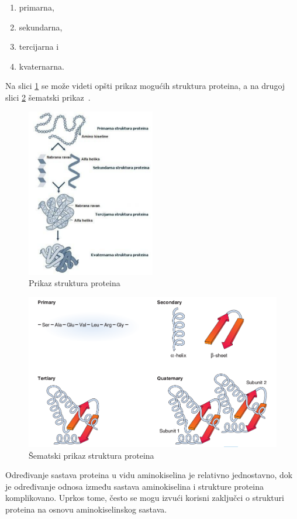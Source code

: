 \begin{enumerate}
\item primarna,
\item sekundarna,
\item tercijarna i
\item kvaternarna.
\end{enumerate}
Na slici \ref{fig:structures} se može videti opšti prikaz mogućih struktura proteina, a na drugoj slici \ref{fig:structures2} šematski prikaz~\cite{spasic}.
\begin{figure}[H]
	\centering
    \includegraphics[width=0.5\textwidth]{Figures/BO/protein_structures.png}
    \caption{Prikaz struktura proteina}
    \label{fig:structures}
\end{figure}
\begin{figure}[H]
	\centering
    \includegraphics[width=1\textwidth]{Figures/BO/structure_schema.png}
    \caption{Šematski prikaz struktura proteina~\cite{bmbg}}
    \label{fig:structures2}
\end{figure}
Određivanje sastava proteina u vidu aminokiselina je relativno jednostavno, dok je određivanje odnosa između sastava aminokiselina i strukture proteina komplikovano. Uprkos tome, često se mogu izvući korisni zaključci o strukturi proteina na osnovu aminokiselinskog sastava.~\cite{Principi}

